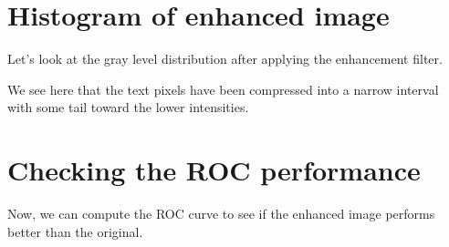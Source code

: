\documentclass[letterpaper,10pt,english]{sphinxmanual}
\begin{document}
\noindent{}


\section{Histogram of enhanced image}
\label{\detokenize{05-AdvancedSegmentation:histogram-of-enhanced-image}}
\sphinxAtStartPar
Let’s look at the gray level distribution after applying the enhancement filter.

\begin{sphinxVerbatim}[commandchars=\\\{\}]
    

    \PYG{p}{[}\PYG{p}{]}
    \PYG{p}{[}\PYG{p}{]} 
                
                
   
\end{sphinxVerbatim}

\noindent{}

\sphinxAtStartPar
We see here that the text pixels have been compressed into a narrow interval with some tail toward the lower intensities.


\section{Checking the ROC performance}
\label{\detokenize{05-AdvancedSegmentation:checking-the-roc-performance}}
\sphinxAtStartPar
Now, we can compute the ROC curve to see if the enhanced image performs better than the original.
\end{document}
